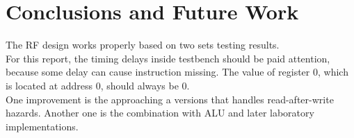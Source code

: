 \documentclass[12pt,fleqn]{article}
\begin{document}
\section{Conclusions and Future Work}
\label{sec:concl}
The RF design works properly based on two sets testing results.
\\ 
For this report, the timing delays inside testbench should be paid attention, because some delay can cause instruction missing. 
The value of register 0, which is located at address 0, should always be 0. 
\\
One improvement is the approaching a versions that handles read-after-write hazards. 
Another one is the combination with ALU and later laboratory implementations.
\end{document}
